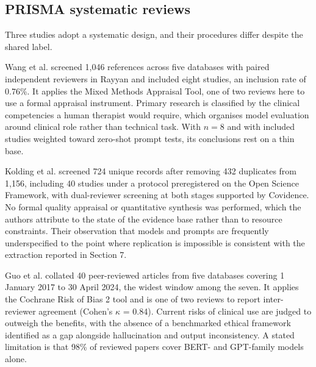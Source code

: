 \documentclass[11pt]{article}
\begin{document}
	\subsection{PRISMA systematic reviews}
	
	Three studies adopt a systematic design, and their procedures differ despite the shared label.
	
	Wang et al.\cite{WANG2025} screened 1,046 references across five databases with paired independent reviewers in Rayyan and included eight studies, an inclusion rate of 0.76\%. It applies the Mixed Methods Appraisal Tool, one of two reviews here to use a formal appraisal instrument. Primary research is classified by the clinical competencies a human therapist would require, which organises model evaluation around clinical role rather than technical task. With $n=8$ and with included studies weighted toward zero-shot prompt tests, its conclusions rest on a thin base.
	
	Kolding et al.\cite{Kolding2025} screened 724 unique records after removing 432 duplicates from 1,156, including 40 studies under a protocol preregistered on the Open Science Framework, with dual-reviewer screening at both stages supported by Covidence. No formal quality appraisal or quantitative synthesis was performed, which the authors attribute to the state of the evidence base rather than to resource constraints. Their observation that models and prompts are frequently underspecified to the point where replication is impossible is consistent with the extraction reported in Section 7.
	
	Guo et al.\cite{GUO2024} collated 40 peer-reviewed articles from five databases covering 1 January 2017 to 30 April 2024, the widest window among the seven. It applies the Cochrane Risk of Bias 2 tool and is one of two reviews to report inter-reviewer agreement (Cohen's $\kappa$ = 0.84). Current risks of clinical use are judged to outweigh the benefits, with the absence of a benchmarked ethical framework identified as a gap alongside hallucination and output inconsistency. A stated limitation is that 98\% of reviewed papers cover BERT- and GPT-family models alone.
	
\end{document}
